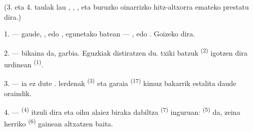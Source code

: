 %
%
%

\VUsaut{3.0mm}
\VUsaut{1.6mm}
\VUsaut{3.4mm}

(3. eta 4. taulak lau  ,
, ,  eta 
buruzko oinarrizko hitz-altxorra emateko prestatu dira.)
\VUsaut{4.0mm}

\VUsaut{3.0mm}

\VUsaut{2.4mm}

\VUsaut{3.0mm}

1. ---  gaude, ,  edo
,  egunetako batean --- ,
 edo . Goizeko  dira.

2. ---  bikaina da,  garbia. Eguzkiak distiratzen
du.  txiki batzuk \textsuperscript{(2)} igotzen dira 
urdinean \textsuperscript{(1)}.

3. ---  ia ez dute . 
lerdenak \textsuperscript{(3)} eta  garaia \textsuperscript{(17)}
kimuz bakarrik estalita daude oraindik.

4. ---  \textsuperscript{(4)} itzuli dira eta oihu alaiez biraka
dabiltza  \textsuperscript{(7)} inguruan:
 \textsuperscript{(5)} da, zeina herriko
 \textsuperscript{(6)} gainean altxatzen baita.

